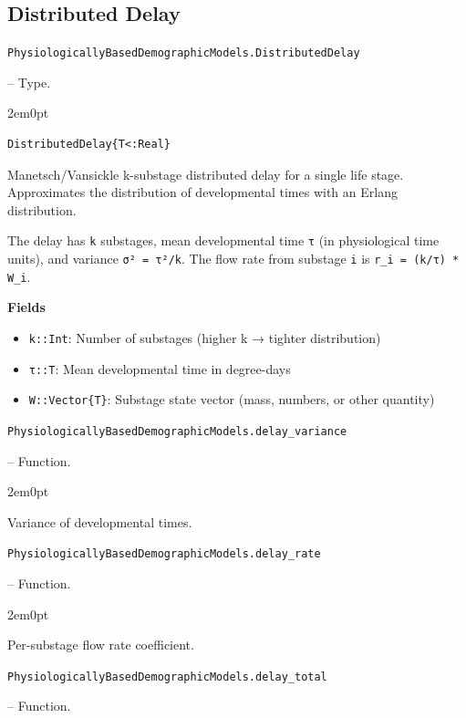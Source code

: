 \subsection{Distributed Delay}



\label{6032565882957612240}{}

\hypertarget{14166737599076836310}{\texttt{PhysiologicallyBasedDemographicModels.DistributedDelay}}  -- {Type.}

\begin{adjustwidth}{2em}{0pt}


\begin{verbatim}
DistributedDelay{T<:Real}
\end{verbatim}

Manetsch/Vansickle k-substage distributed delay for a single life stage. Approximates the distribution of developmental times with an Erlang distribution.

The delay has \texttt{k} substages, mean developmental time \texttt{τ} (in physiological time units), and variance \texttt{σ² = τ²/k}. The flow rate from substage \texttt{i} is \texttt{r\_i = (k/τ) * W\_i}.

\textbf{Fields}

\begin{itemize}
\item \texttt{k::Int}: Number of substages (higher k → tighter distribution)


\item \texttt{τ::T}: Mean developmental time in degree-days


\item \texttt{W::Vector\{T\}}: Substage state vector (mass, numbers, or other quantity)

\end{itemize}


\end{adjustwidth}
\hypertarget{16172890056580892436}{\texttt{PhysiologicallyBasedDemographicModels.delay\_variance}}  -- {Function.}

\begin{adjustwidth}{2em}{0pt}

Variance of developmental times.



\end{adjustwidth}
\hypertarget{2086683829569889748}{\texttt{PhysiologicallyBasedDemographicModels.delay\_rate}}  -- {Function.}

\begin{adjustwidth}{2em}{0pt}

Per-substage flow rate coefficient.



\end{adjustwidth}
\hypertarget{2066087858143907975}{\texttt{PhysiologicallyBasedDemographicModels.delay\_total}}  -- {Function.}

